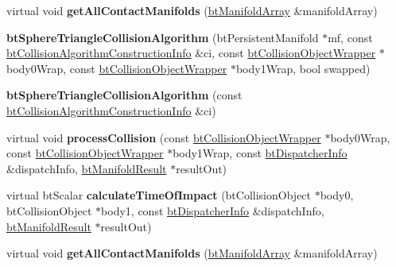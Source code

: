 \begin{DoxyCompactItemize}
\item 
\mbox{\label{classbtSphereTriangleCollisionAlgorithm_a5f222156d65a50624295f00542ccd56f}} 
virtual void {\bfseries get\+All\+Contact\+Manifolds} (\hyperlink{classbtAlignedObjectArray}{bt\+Manifold\+Array} \&manifold\+Array)
\item 
\mbox{\label{classbtSphereTriangleCollisionAlgorithm_a278144bf8f19f8d1873ef2c9f6c6667c}} 
{\bfseries bt\+Sphere\+Triangle\+Collision\+Algorithm} (bt\+Persistent\+Manifold $\ast$mf, const \hyperlink{structbtCollisionAlgorithmConstructionInfo}{bt\+Collision\+Algorithm\+Construction\+Info} \&ci, const \hyperlink{structbtCollisionObjectWrapper}{bt\+Collision\+Object\+Wrapper} $\ast$body0\+Wrap, const \hyperlink{structbtCollisionObjectWrapper}{bt\+Collision\+Object\+Wrapper} $\ast$body1\+Wrap, bool swapped)
\item 
\mbox{\label{classbtSphereTriangleCollisionAlgorithm_ad21f16e3d6cd90274a39f34e8feef9bf}} 
{\bfseries bt\+Sphere\+Triangle\+Collision\+Algorithm} (const \hyperlink{structbtCollisionAlgorithmConstructionInfo}{bt\+Collision\+Algorithm\+Construction\+Info} \&ci)
\item 
\mbox{\label{classbtSphereTriangleCollisionAlgorithm_a793aac62f7141d4e2f7549f50499483f}} 
virtual void {\bfseries process\+Collision} (const \hyperlink{structbtCollisionObjectWrapper}{bt\+Collision\+Object\+Wrapper} $\ast$body0\+Wrap, const \hyperlink{structbtCollisionObjectWrapper}{bt\+Collision\+Object\+Wrapper} $\ast$body1\+Wrap, const \hyperlink{structbtDispatcherInfo}{bt\+Dispatcher\+Info} \&dispatch\+Info, \hyperlink{classbtManifoldResult}{bt\+Manifold\+Result} $\ast$result\+Out)
\item 
\mbox{\label{classbtSphereTriangleCollisionAlgorithm_a3c904ffdd29b36e5c514f4514b913c7a}} 
virtual bt\+Scalar {\bfseries calculate\+Time\+Of\+Impact} (bt\+Collision\+Object $\ast$body0, bt\+Collision\+Object $\ast$body1, const \hyperlink{structbtDispatcherInfo}{bt\+Dispatcher\+Info} \&dispatch\+Info, \hyperlink{classbtManifoldResult}{bt\+Manifold\+Result} $\ast$result\+Out)
\item 
\mbox{\label{classbtSphereTriangleCollisionAlgorithm_a5f222156d65a50624295f00542ccd56f}} 
virtual void {\bfseries get\+All\+Contact\+Manifolds} (\hyperlink{classbtAlignedObjectArray}{bt\+Manifold\+Array} \&manifold\+Array)
\end{DoxyCompactItemize}
